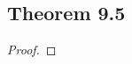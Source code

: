 \documentclass[../../main.tex]{subfiles}
\begin{document}
\subsection{Theorem 9.5}
\begin{wts}

\end{wts}
\begin{proof}

\end{proof}
\end{document}
